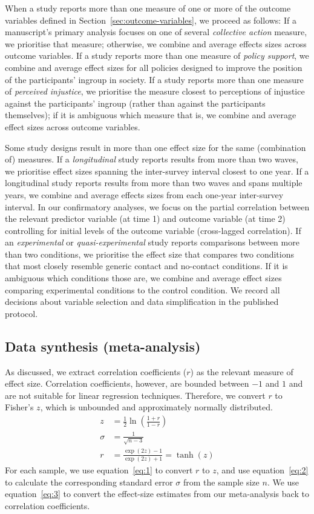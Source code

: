 \documentclass[10pt, a4paper]{article}
\begin{document}
When a study reports more than one measure of one or more of the outcome variables defined in Section~\ref{sec:outcome-variables}, we proceed as follows: If a manuscript's primary analysis focuses on one of several \emph{collective action} measure, we prioritise that measure; otherwise, we combine and average effects sizes across outcome variables. If a study reports more than one measure of \emph{policy support}, we combine and average effect sizes for all policies designed to improve the position of the participants' ingroup in society. If a study reports more than one measure of \emph{perceived injustice}, we prioritise the measure closest to perceptions of injustice against the participants' ingroup (rather than against the participants themselves); if it is ambiguous which measure that is, we combine and average effect sizes across outcome variables.

Some study designs result in more than one effect size for the same (combination of) measures. If a \emph{longitudinal} study reports results from more than two waves, we prioritise effect sizes spanning the inter-survey interval closest to one year. If a longitudinal study reports results from more than two waves and spans multiple years, we combine and average effects sizes from each one-year inter-survey interval. In our confirmatory analyses, we focus on the partial correlation between the relevant predictor variable (at time 1) and outcome variable (at time 2) controlling for initial levels of the outcome variable (cross-lagged correlation). If an \emph{experimental} or \emph{quasi-experimental} study reports comparisons between more than two conditions, we prioritise the effect size that compares two conditions that most closely resemble generic contact and no-contact conditions. If it is ambiguous which conditions those are, we combine and average effect sizes comparing experimental conditions to the control condition. We record all decisions about variable selection and data simplification in the published protocol.

\subsection{Data synthesis (meta-analysis)}
\label{sec:data-synthesis}

As discussed, we extract correlation coefficients ($r$) as the relevant measure of effect size. Correlation coefficients, however, are bounded between $-1$ and $1$ and are not suitable for linear regression techniques. Therefore, we convert $r$ to Fisher's $z$, which is unbounded and approximately normally distributed.
\begin{align}
z & = \frac{1}{2} \ln\left(\frac{1 + r}{1 - r}\right) \label{eq:1} \\
\sigma & = \frac{1}{\sqrt{n - 3}} \label{eq:2} \\
r &= \frac{\exp(2z) - 1}{\exp(2z) + 1} = \tanh(z) \label{eq:3}
\end{align}
For each sample, we use equation~\ref{eq:1} to convert $r$ to $z$, and use equation~\ref{eq:2} to calculate the corresponding standard error $\sigma$ from the sample size $n$. We use equation~\ref{eq:3} to convert the effect-size estimates from our meta-analysis back to correlation coefficients.
\end{document}
